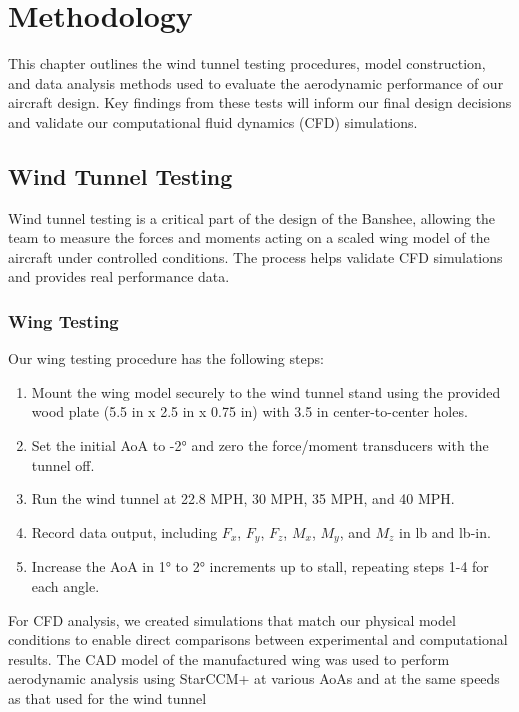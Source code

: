 \chapter{Methodology} \label{cp:methodology}

This chapter outlines the wind tunnel testing procedures, model construction, and data analysis methods used to evaluate the aerodynamic performance of our aircraft design. Key findings from these tests will inform our final design decisions and validate our computational fluid dynamics (CFD) simulations.

\section{Wind Tunnel Testing}

Wind tunnel testing is a critical part of the design of the Banshee, allowing the team to measure the forces and moments acting on a scaled wing model of the aircraft under controlled conditions. The process helps validate CFD simulations and provides real performance data.

\subsection{Wing Testing}

Our wing testing procedure has the following steps:

\begin{enumerate}
    \item Mount the wing model securely to the wind tunnel stand using the provided wood plate (5.5 in x 2.5 in x 0.75 in) with 3.5 in center-to-center holes.
    \item Set the initial AoA to -2° and zero the force/moment transducers with the tunnel off.
    \item Run the wind tunnel at 22.8 MPH, 30 MPH, 35 MPH, and 40 MPH.
    \item Record data output, including $F_x$, $F_y$, $F_z$, $M_x$, $M_y$, and $M_z$ in lb and lb-in.
    \item Increase the AoA in 1° to 2° increments up to stall, repeating steps 1-4 for each angle.
\end{enumerate}

For CFD analysis, we created simulations that match our physical model conditions to enable direct comparisons between experimental and computational results.
The CAD model of the manufactured wing was used to perform aerodynamic analysis using StarCCM+ at various AoAs and at the same speeds as that used for the wind tunnel

